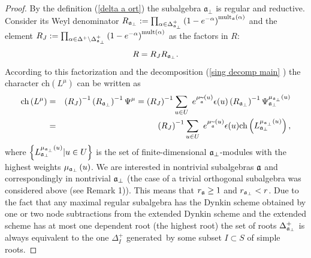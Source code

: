 \documentclass[12pt]{article}
\theoremstyle{definition}
\begin{document}
\bigskip
\begin{proof}
By the definition (\ref{delta a ort}) the subalgebra $%
\mathfrak{a}_{\bot }$ is regular and reductive. Consider its Weyl
denominator $R_{\frak{a}_{\perp }}:=\prod_{\alpha \in \Delta _{\frak{a}%
_{\perp }}^{+}}\left( 1-e^{-\alpha }\right) ^{\mathrm{mult}_{\frak{a}}%
\mathrm{\left( \alpha \right) }}$ and the element $R_{J}:=\prod_{\alpha \in
\Delta ^{+}\setminus \Delta _{\frak{a}_{\perp }}^{+}}\left( 1-e^{-\alpha
}\right) ^{\mathrm{mult}(\alpha )}$ as the factors in $R$: $\quad $%
\begin{equation*}
R=R_{J}R_{\frak{a}_{\perp }}.
\end{equation*}
According to this factorization and the decomposition (\ref{sing decomp main}%
) the character $\mathrm{ch}\left( L^{\mu }\right) $ can be written as
\begin{eqnarray*}
\mathrm{ch}\left( L^{\mu }\right) &=&\left( R_{J}\right) ^{-1}\left( R_{%
\frak{a}_{\perp }}\right) ^{-1}\Psi ^{\mu }=\left( R_{J}\right)
^{-1}\sum_{u\in U}\;e^{\mu _{\widetilde{\frak{a}}}\left( u\right) }\epsilon
(u)\left( R_{\frak{a}_{\perp }}\right) ^{-1}\Psi _{\frak{a}_{\perp }}^{\mu _{%
\frak{a}_{\perp }}\left( u\right) } \\
&=&\left( R_{J}\right) ^{-1}\sum_{u\in U}\;e^{\mu _{\widetilde{\frak{a}}%
}\left( u\right) }\epsilon (u)\mathrm{ch}\left( L_{\frak{a}_{\perp }}^{\mu _{\frak{a}_{\perp
}}\left( u\right) }\right),
\end{eqnarray*}
where $\left\{ L_{\frak{a}_{\perp }}^{\mu _{\frak{a}_{\perp }}\left(
u\right) }|u\in U\right\} $ is the set of finite-dimensional $\frak{a}%
_{\perp }$-modules with the highest weights $\mu _{\frak{a}_{\perp }}\left(
u\right) $. We are interested in nontrivial subalgebras $\frak{a}$ and
correspondingly in nontrivial $\frak{a}_{\perp }$ (the case of a trivial
orthogonal subalgebra was considered above (see Remark 1)). This means that $r_{\frak{a}}\geq 1$ and $r_{\frak{a}%
_{\perp }}<r$. Due to the fact that any maximal regular subalgebra has the
Dynkin scheme obtained by one or two node subtractions from the extended
Dynkin scheme and the extended scheme has at most one dependent root (the
highest root) the set of roots $\Delta _{\frak{a}_{\perp }}^{+}$ is always
equivalent to the one $\Delta _{I}^{+}$ generated\ by some subset $I\subset
S $ of simple roots.


\end{proof}
\end{document}
